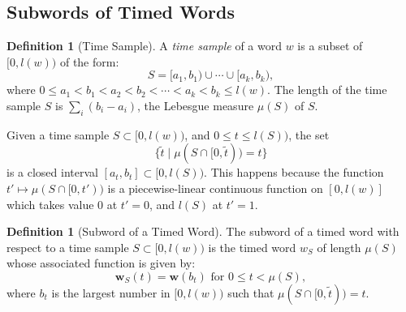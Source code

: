 \documentclass[10pt]{amsproc}
\theoremstyle{definition}
\newtheorem{definition}[theorem]{Definition}
\theoremstyle{remark}
\begin{document}
\subsection{Subwords of Timed Words}
\label{sec:subwords-timed-words}
\begin{definition}
  [Time Sample]
  A \emph{time sample} of a word $w$ is a subset of $[0,l(w))$ of the form:
  \begin{displaymath}
    S = [a_1,b_1)\cup \dotsb \cup [a_k,b_k),
  \end{displaymath}
  where $0\leq a_1 < b_1 < a_2 < b_2 < \dotsb <a_k < b_k \leq l(w)$.
  The length of the time sample $S$ is $\sum_i (b_i-a_i)$, the Lebesgue measure $\mu(S)$ of $S$.
\end{definition}
Given a time sample $S\subset [0, l(w))$, and $0\leq t\leq l(S))$, the set
\begin{displaymath}
  \{\tilde t \mid \mu(S\cap [0,\tilde t)) = t\}
\end{displaymath}
is a closed interval $[a_t,b_t]\subset [0, l(S))$.
This happens because the function $t'\mapsto \mu(S\cap [0,t'))$ is a piecewise-linear continuous function on $[0,l(w)]$ which takes value $0$ at $t'=0$, and $l(S)$ at $t'=1$.
\begin{definition}
  [Subword of a Timed Word]
  \label{definition:timed-subword}
  The subword of a timed word with respect to a time sample $S\subset [0, l(w))$ is the timed word $w_S$ of length $\mu(S)$ whose associated function is given by:
  \begin{displaymath}
    \mathbf w_S(t) =  \mathbf w(b_t) \text{ for } 0\leq t < \mu(S),
  \end{displaymath}
  where $b_t$ is the largest number in $[0,l(w))$ such that $\mu(S\cap [0, \tilde t)) = t$.
\end{definition}
\end{document}
